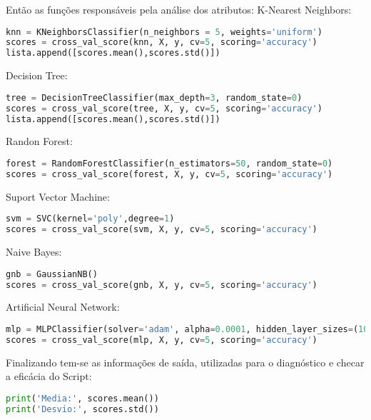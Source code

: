 Então as funções responsáveis pela análise dos atributos:
K-Nearest Neighbors:
\begin{lstlisting}[language=Python, caption=KNeighborsClassifier]
knn = KNeighborsClassifier(n_neighbors = 5, weights='uniform')
scores = cross_val_score(knn, X, y, cv=5, scoring='accuracy')
lista.append([scores.mean(),scores.std()])
\end{lstlisting}

Decision Tree:
\begin{lstlisting}[language=Python, caption=DecisionTreeClassifier]
tree = DecisionTreeClassifier(max_depth=3, random_state=0)
scores = cross_val_score(tree, X, y, cv=5, scoring='accuracy')
lista.append([scores.mean(),scores.std()])
\end{lstlisting}

Randon Forest:
\begin{lstlisting}[language=Python, caption=RandomForesClassifier]
forest = RandomForestClassifier(n_estimators=50, random_state=0)
scores = cross_val_score(forest, X, y, cv=5, scoring='accuracy')
\end{lstlisting}

Suport Vector Machine:
\begin{lstlisting}[language=Python, caption=SVC]
svm = SVC(kernel='poly',degree=1)
scores = cross_val_score(svm, X, y, cv=5, scoring='accuracy')
\end{lstlisting}
Naive Bayes:
\begin{lstlisting}[language=Python, caption=GaussianNB]
gnb = GaussianNB()
scores = cross_val_score(gnb, X, y, cv=5, scoring='accuracy')
\end{lstlisting}

Artificial Neural Network:
\begin{lstlisting}[language=Python, caption=MLPClassifier]
mlp = MLPClassifier(solver='adam', alpha=0.0001, hidden_layer_sizes=(10,20,40), random_state=42, learning_rate='constant', learning_rate_init=0.01, max_iter=100, activation='logistic', momentum=0.9, tol=0.0001)
scores = cross_val_score(mlp, X, y, cv=5, scoring='accuracy')
\end{lstlisting}

Finalizando tem-se as informações de saída, utilizadas para o diagnóstico e checar a eficácia do Script:
\begin{lstlisting}[language=Python, caption=Média e Desvio]
print('Media:', scores.mean())
print('Desvio:', scores.std())
\end{lstlisting}

